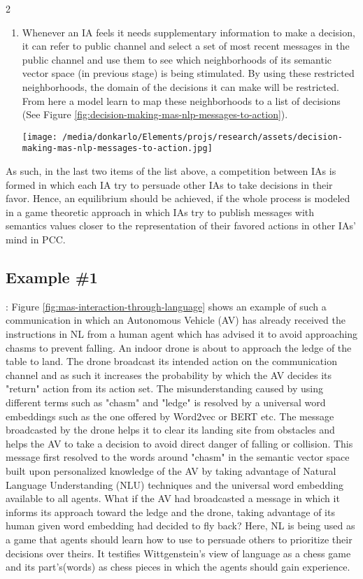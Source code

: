 \documentclass{article}
\begin{document}
\begin{multicols}{2}
\begin{enumerate}
			\item Whenever an IA feels it needs supplementary information to make a decision, it can refer to public channel and select a set of most recent messages in the public channel and use them to see which neighborhoods of its semantic vector space (in previous stage) is being stimulated. By using these restricted neighborhoods, the domain of the decisions it can make will be restricted. From here a model learn to map these neighborhoods to a list of decisions (See Figure \ref{fig:decision-making-mas-nlp-messages-to-action}). 
			\begin{figure*}
				\centering
				\texttt{[image: /media/donkarlo/Elements/projs/research/assets/decision-making-mas-nlp-messages-to-action.jpg]}
				\caption{Messages to action model}
				\label{fig:decision-making-mas-nlp-messages-to-action}
			\end{figure*}
		\end{enumerate}
		As such, in the last two items of the list above, a competition between IAs is formed in which each IA try to persuade other IAs to take decisions in their favor. Hence, an equilibrium should be achieved, if the whole process is modeled in a game theoretic approach in which IAs try to publish messages with semantics values closer to the representation of their favored actions in other IAs' mind in PCC. 
		
		\subsection{Example \#1}: Figure \ref{fig:mas-interaction-through-language} shows an example of such a communication in which an Autonomous Vehicle (AV) has already received the instructions in NL from a human agent which has advised it to avoid approaching chasms to prevent falling. An indoor drone is about to approach the ledge of the table to land. The drone broadcast its intended action on the communication channel and as such it increases the probability by which the AV decides its "return" action from its action set. The misunderstanding caused by using different terms such as "chasm" and "ledge" is resolved by a universal word embeddings such as the one offered by Word2vec or BERT etc. The message broadcasted by the drone helps it to clear its landing site from obstacles and helps the AV to take a decision to avoid direct danger of falling or collision. This message first resolved to the words around "chasm" in the semantic vector space built upon personalized knowledge of the AV by taking advantage of Natural Language Understanding (NLU) techniques and the universal word embedding available to all agents. What if the AV had broadcasted a message in which it informs its approach toward the ledge and the drone, taking advantage of its human given word embedding had decided to fly back? Here, NL is being used as a game that agents should learn how to use to persuade others to prioritize their decisions over theirs. It testifies Wittgenstein's view of language as a chess game and its part's(words) as chess pieces in which the agents should gain experience. 
		

\end{multicols}
\end{document}

